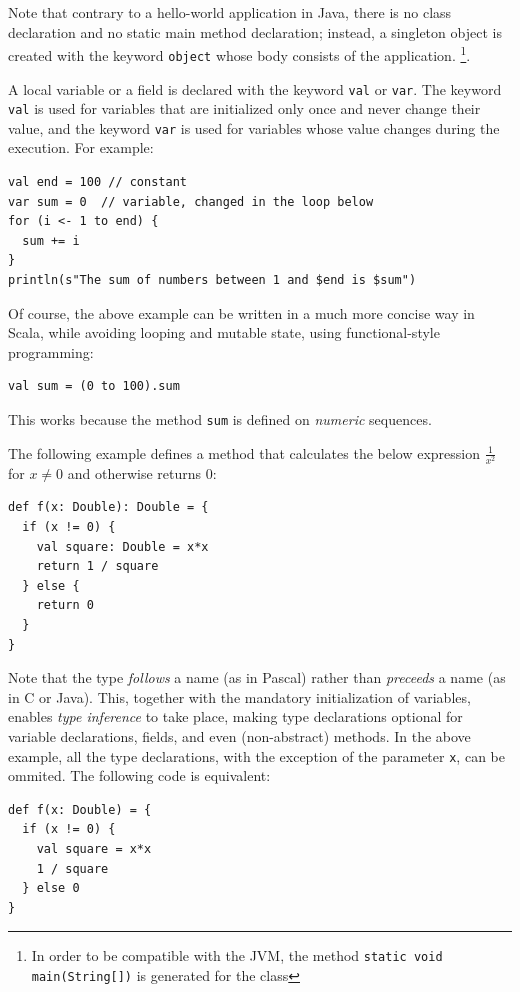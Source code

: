 Note that contrary to a hello-world application in Java, there is no class declaration and no static main method declaration; instead, a singleton object is created with the keyword \texttt{object} whose body consists of the application. \footnote{In order to be compatible with the JVM, the method \texttt{static void main(String[])} is generated for the class}.

A local variable or a field is declared with the keyword \texttt{val} or \texttt{var}. The keyword \texttt{val} is used for variables that are initialized only once and never change their value, and the keyword \texttt{var} is used for variables whose value changes during the execution. For example:

\begin{lstlisting}
val end = 100 // constant
var sum = 0  // variable, changed in the loop below
for (i <- 1 to end) {
  sum += i
}
println(s"The sum of numbers between 1 and $end is $sum")
\end{lstlisting}

Of course, the above example can be written in a much more concise way in Scala, while avoiding looping and mutable state, using functional-style programming:
\begin{lstlisting}
val sum = (0 to 100).sum
\end{lstlisting} 

This works because the method \texttt{sum} is defined on \emph{numeric} sequences.

The following example defines a method that calculates the below expression \(\frac{1}{x^2}\) for \(x \neq 0\) and otherwise returns \(0\):

\begin{lstlisting}
def f(x: Double): Double = {
  if (x != 0) {
    val square: Double = x*x
    return 1 / square 
  } else {
    return 0
  }
}
\end{lstlisting}

Note that the type \emph{follows} a name (as in Pascal) rather than \emph{preceeds} a name (as in C or Java). This, together with the mandatory initialization of variables, enables \emph{type inference} to take place, making type declarations optional for variable declarations, fields, and even (non-abstract) methods. In the above example, all the type declarations, with the exception of the parameter \texttt{x}, can be ommited. The following code is equivalent:
\begin{lstlisting}
def f(x: Double) = {
  if (x != 0) {
    val square = x*x
    1 / square 
  } else 0
}
\end{lstlisting}


